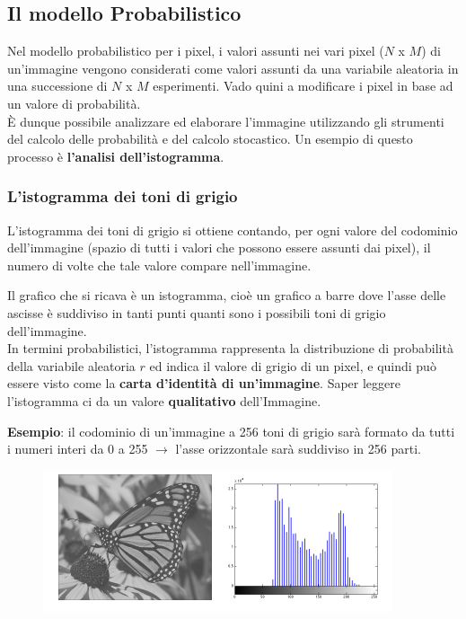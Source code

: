 \subsection{Il modello Probabilistico}

Nel modello probabilistico per i pixel, i valori assunti nei vari pixel ($N$ x
$M$) di un'immagine vengono considerati come valori assunti da una variabile
aleatoria in una successione di $N$ x $M$ esperimenti. Vado quini a modificare i
pixel in base ad un valore di probabilità. \\È dunque possibile analizzare ed
elaborare l'immagine utilizzando gli strumenti del calcolo delle probabilità e
del calcolo stocastico. Un esempio di questo processo è \textbf{l'analisi
    dell'istogramma}.

\subsubsection{L'istogramma dei toni di grigio}

\begin{definition}
    L'istogramma dei toni di grigio si ottiene contando, per ogni valore del
    codominio dell'immagine (spazio di tutti i valori che possono essere assunti
    dai pixel), il numero di volte che tale valore compare nell'immagine.
\end{definition}

Il grafico che si ricava è un istogramma, cioè un grafico a barre dove l'asse delle ascisse è suddiviso in tanti punti quanti sono i
possibili toni di grigio dell'immagine.\\

In termini probabilistici, l'istogramma rappresenta la distribuzione di probabilità della variabile
aleatoria $r$ ed indica il valore di grigio di un pixel, e quindi può essere visto come
la \textbf{carta d'identità di un'immagine}. Saper leggere l'istogramma ci
da un valore \textbf{qualitativo} dell'Immagine.

\begin{trivlist}
    \item \textbf{Esempio}: il codominio di un'immagine a 256 toni di grigio sarà formato da tutti i numeri interi da 0 a 255 $\rightarrow$ l'asse orizzontale sarà suddiviso in 256 parti.
\end{trivlist}

\begin{figure}[H]
    \centering
    \includegraphics[width=\linewidth, keepaspectratio]{capitoli/immagini/imgs/esempio-istogramma.png}
\end{figure}

